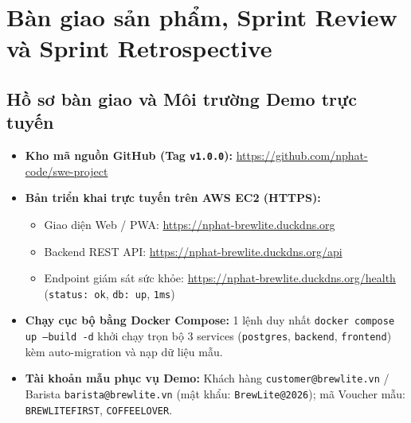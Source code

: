 \documentclass[a4paper,12pt]{article}
\begin{document}
\newpage
\section{Bàn giao sản phẩm, Sprint Review và Sprint Retrospective}

\subsection{Hồ sơ bàn giao và Môi trường Demo trực tuyến}
\begin{itemize}
  \item \textbf{Kho mã nguồn GitHub (Tag \texttt{v1.0.0}):} \url{https://github.com/nphat-code/swe-project}
  \item \textbf{Bản triển khai trực tuyến trên AWS EC2 (HTTPS):}
    \begin{itemize}
      \item Giao diện Web / PWA: \url{https://nphat-brewlite.duckdns.org}
      \item Backend REST API: \url{https://nphat-brewlite.duckdns.org/api}
      \item Endpoint giám sát sức khỏe: \url{https://nphat-brewlite.duckdns.org/health} (\texttt{status: ok}, \texttt{db: up}, \texttt{1ms})
    \end{itemize}
  \item \textbf{Chạy cục bộ bằng Docker Compose:} 1 lệnh duy nhất \texttt{docker compose up --build -d} khởi chạy trọn bộ 3 services (\texttt{postgres}, \texttt{backend}, \texttt{frontend}) kèm auto-migration và nạp dữ liệu mẫu.
  \item \textbf{Tài khoản mẫu phục vụ Demo:} Khách hàng \texttt{customer@brewlite.vn} / Barista \texttt{barista@brewlite.vn} (mật khẩu: \texttt{BrewLite@2026}); mã Voucher mẫu: \texttt{BREWLITEFIRST}, \texttt{COFFEELOVER}.
\end{itemize}
\end{document}
